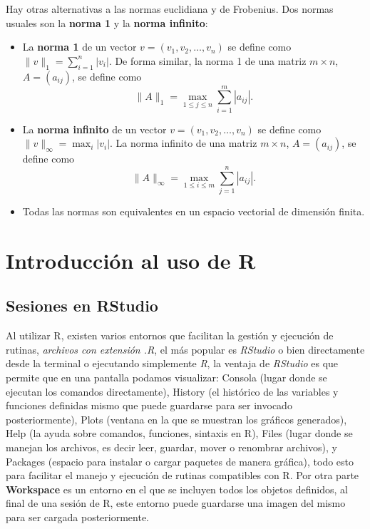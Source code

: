 \documentclass[12pt]{article}
\begin{document}
Hay otras alternativas a las normas euclidiana y de Frobenius. Dos normas usuales son la \textbf{norma 1} y la \textbf{norma infinito}:

\begin{itemize}
\item La \textbf{norma 1} de un vector $ v = (v_1, v_2, \ldots, v_n) $ se define como $ \|v\|_1 = \sum_{i=1}^n |v_i| $.  De forma similar, la norma 1 de una matriz $ m \times n $, $ A = (a_{ij}) $, se define como $$\|A\|_1 = \max_{1 \leq j \leq n} \sum_{i=1}^m |a_{ij}|.$$

\item La \textbf{norma infinito} de un vector $ v = (v_1, v_2, \ldots, v_n) $ se define como $ \|v\|_\infty = \max_i |v_i| $.   La norma infinito de una matriz $ m \times n $, $ A = (a_{ij}) $, se define como  $$\|A\|_\infty = \max_{1 \leq i \leq m} \sum_{j=1}^n |a_{ij}|.$$

\item Todas las normas son equivalentes en un espacio vectorial de dimensión finita. 

\end{itemize}

\section{Introducción al uso de R}


\subsection{Sesiones en RStudio}


Al utilizar R, existen varios entornos que facilitan la gestión y ejecución de rutinas,  \textit{archivos con extensión .R}, el más popular es \textit{RStudio} o bien directamente desde la terminal o ejecutando simplemente \textit{R}, la ventaja de \textit{RStudio} es que permite que en una pantalla podamos visualizar: Consola (lugar donde se ejecutan los comandos directamente), History (el histórico de las variables y funciones definidas mismo que puede guardarse para ser invocado posteriormente), Plots (ventana en la que se muestran los gráficos generados), Help (la ayuda sobre comandos, funciones, sintaxis en R), Files (lugar donde se manejan los archivos, es decir leer, guardar, mover o renombrar archivos), y Packages (espacio para instalar o cargar paquetes de manera gráfica), todo esto para facilitar el manejo y ejecución de rutinas compatibles con R. Por otra parte \textbf{Workspace} es un entorno en el que se incluyen todos los objetos definidos,  al final de una sesión de R,  este entorno puede guardarse una imagen del mismo para ser cargada posteriormente. \bigskip
\end{document}
